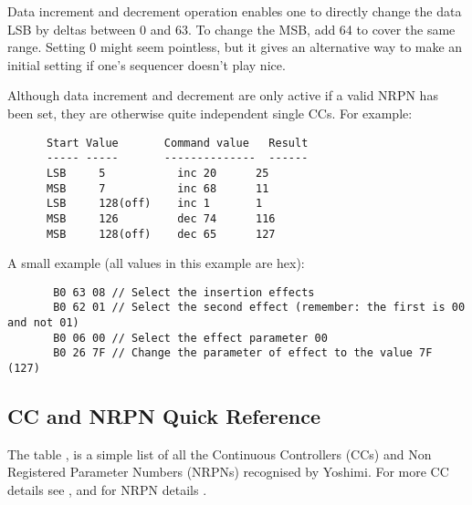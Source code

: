    Data increment and decrement operation enables one to directly change the
   data LSB by deltas between 0 and 63.
   To change the MSB, add 64 to cover the same
   range. Setting 0 might seem pointless, but it gives an alternative way
   to make an initial setting if one's sequencer doesn't play nice.

   Although data increment and decrement are only active if a valid NRPN has
   been set, they are otherwise quite independent single CCs.  For example:

   \begin{verbatim}
      Start Value       Command value   Result
      ----- -----       --------------  ------
      LSB     5           inc 20      25
      MSB     7           inc 68      11
      LSB     128(off)    inc 1       1
      MSB     126         dec 74      116
      MSB     128(off)    dec 65      127
   \end{verbatim}

   A small example (all values in this example are hex):

   \begin{verbatim}
       B0 63 08 // Select the insertion effects
       B0 62 01 // Select the second effect (remember: the first is 00 and not 01)
       B0 06 00 // Select the effect parameter 00
       B0 26 7F // Change the parameter of effect to the value 7F (127)
   \end{verbatim}

\subsection{CC and NRPN Quick Reference}
\label{subsection:cc_nrpn_quick_ref}
   The table , is a simple list of all the
   Continuous Controllers (CCs) and Non Registered Parameter Numbers (NRPNs)
   recognised by Yoshimi.
   For more CC details see , and for NRPN details .

